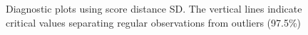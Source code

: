 \begin{figure}
	\centering  
	
	\caption{Diagnostic plots using score distance SD. The vertical lines indicate critical values separating regular observations from outliers (97.5\%)}
	\label{sd}
\end{figure}
